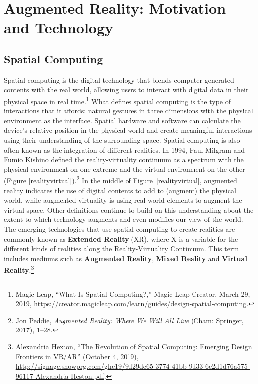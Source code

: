 \chapter[Augmented Reality]{Augmented Reality: Motivation and Technology}\label{text}

\section{Spatial Computing}
Spatial computing is the digital technology that blends computer-generated contents with the real world, allowing users to interact with digital data in their physical space in real time.\footnote{Magic Leap, “What Is Spatial Computing?,” Magic Leap Creator, March 29, 2019, \url{https://creator.magicleap.com/learn/guides/design-spatial-computing}.} What defines spatial computing is the type of interactions that it affords: natural gestures in three dimensions with the physical environment as the interface. Spatial hardware and software can calculate the device's relative position in the physical world and create meaningful interactions using their understanding of the surrounding space. Spatial computing is also often known as the integration of different realities. In 1994, Paul Milgram and Fumio Kishino defined the reality-virtuality continuum as a spectrum with the physical environment on one extreme and the  virtual environment on the other (Figure \ref{realityvirtual}).\footnote{Jon Peddie, \textit{Augmented Reality: Where We Will All Live} (Cham: Springer, 2017), 1–28.} In the middle of Figure~\ref{realityvirtual}, augmented reality indicates the use of digital contents to add to (augment) the physical world, while augmented virtuality is using real-world elements to augment the virtual space. Other definitions continue to build on this understanding about the extent to which technology augments and even modifies our view of the world. The emerging technologies that use spatial computing to create realities are commonly known as \textbf{Extended Reality} (XR), where X is a variable for the different kinds of realities along the Reality-Virtuality Continuum. This term includes mediums such as \textbf{Augmented Reality}, \textbf{Mixed Reality} and \textbf{Virtual Reality}.\footnote{Alexandria Hexton, “The Revolution of Spatial Computing: Emerging Design Frontiers in VR/AR” (October 4, 2019), \url{http://signage.showprg.com/ghc19/9d29dc65-3774-41bb-9d33-6c2d1d76a575-96117-Alexandria-Heston.pdf}.}

\begin{figure}[!ht]
\end{figure}

